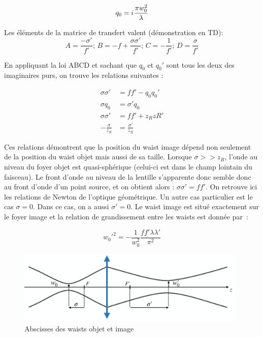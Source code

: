 \documentclass[a4paper]{book}
\newcommand{\iu}{{i\mkern1mu}}
\begin{document}
\begin{equation}
    q_0=\iu \frac{\pi w_0^2}{\lambda}
\end{equation}

Les éléments de la matrice de transfert valent (démonstration en TD):
\begin{equation}
    A=\frac{-\sigma'}{f'};\,B=-f+\frac{\sigma \sigma'}{f'};\,C=-\frac{1}{f'};\,D=\frac{\sigma}{f'}
\end{equation}

En appliquant la loi ABCD et sachant que $q_0$ et $q_0'$ sont tous les deux des imaginaires purs, on trouve les relations suivantes :

\begin{align}
    \sigma \sigma'&=ff'-q_0q_0'\\
    \sigma q_0 &= \sigma'q_0\\
    \sigma \sigma' &= ff' + z_RzR'\\
    -\frac{\sigma}{z_R}&=\frac{\sigma'}{z_R}
\end{align}

Ces relations démontrent que la position du waist image dépend non seulement de la position du waist objet mais aussi de sa taille. Lorsque $\sigma>>z_R$, l'onde au niveau du foyer objet est quasi-sphérique (celui-ci est dans le champ lointain du faisceau). Le front d'onde au niveau de la lentille s'apparente donc semble donc au front d'onde d'un point source, et on obtient alors : $\sigma\sigma'=ff'$. On retrouve ici les relations de Newton de l'optique géométrique.
Un autre cas particulier est le cas $\sigma=0$. Dans ce cas, on a aussi $\sigma'=0$. Le waist image est situé exactement sur le foyer image et la relation de grandissement entre les waists est donnée par~:

\begin{equation}
    w_0'^2=-\frac{1}{w_0^2}\frac{ff'\lambda\lambda'}{\pi^2}
\end{equation}

\begin{figure}[!htbp]
\begin{center}
\includegraphics[width=11cm]{pictures/GaussianConjugates.png}
\end{center}
\caption{Abscisses des waists objet et image}
\label{fig:conjugaison_gauss}
\end{figure}
\end{document}

